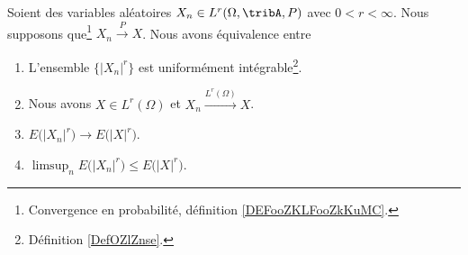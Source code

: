 \begin{theorem}	\label{THOooEPYBooHlSuLI}
	Soient des variables aléatoires \( X_n\in L^r(\Omega,\tribA,P)\) avec \( 0<r<\infty\). Nous supposons que\footnote{Convergence en probabilité, définition \ref{DEFooZKLFooZkKuMC}.} \( X_n\stackrel{ P}{\longrightarrow} X\). Nous avons équivalence entre
	\begin{enumerate}
		\item		\label{SPITEMooGKRVooQoDfKm}
		      L'ensemble \( \{ | X_n |^r \}\) est uniformément intégrable\footnote{Définition \ref{DefOZlZnse}.}.
		\item		\label{SPITEMooUYTKooBClYcR}
		      Nous avons \( X\in L^r(\Omega) \) et \( X_n\stackrel{ L^r(\Omega)}{\longrightarrow} X\).
		\item		\label{SPITEMooQYLOooDiBvne}
		      \( E\big( | X_n |^r \big)\to E\big( | X |^r \big)\).
		\item		\label{SPITEMooRVFAooXUNQlf}
		      \( \limsup_n E\big( | X_n |^r \big)\leq E\big( | X |^r \big)\).
	\end{enumerate}
\end{theorem}

